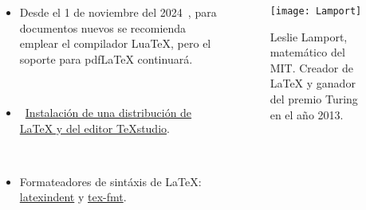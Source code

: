 \begin{frame}
\begin{columns}
\begin{column}{.58\paperwidth}
\begin{itemize}[<+->]
				      \textcolor{cyan}{}~\href{https://tex.stackexchange.com/q/339}{Lista
					      de editores de \LaTeX{}}.

				      \

				\item

				      Desde el 1 de noviembre del 2024~\cite{LaTeX40},
				      para documentos nuevos se recomienda emplear el
				      compilador Lua\TeX, pero el soporte para pdf\LaTeX{}
				      continuará.

				      \

				\item

				      \textcolor{red}{}~\href{https://www.youtube.com/watch?v=Pa3eQ_OlBeE}{Instalación
					      de una distribución de \LaTeX{} y del editor \TeX{}studio}.

				      \

				\item

				      Formateadores de sintáxis de \LaTeX{}:
				      \href{https://github.com/cmhughes/latexindent.pl}{latexindent}
				      y \href{https://github.com/WGUNDERWOOD/tex-fmt}{tex-fmt}.
			\end{itemize}
		\end{column}
		\begin{column}{.38\paperwidth}
			\begin{figure}[ht!]
				\centering
				\texttt{[image: Lamport]}
				\caption{Leslie Lamport, matemático del MIT.
					Creador de \LaTeX{} y ganador del premio Turing en el año 2013.}
			\end{figure}
		\end{column}
	\end{columns}
\end{frame}



